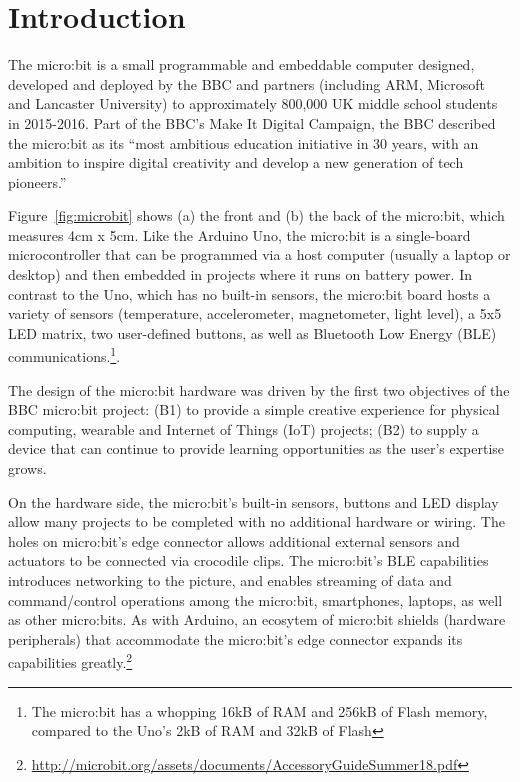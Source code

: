 \section{Introduction}
\label{sec:intrp}


The micro:bit is a small programmable and embeddable computer designed, 
developed and deployed by the BBC and partners (including ARM, Microsoft
and Lancaster University) to approximately 800,000 UK middle school students
in 2015-2016. Part of the BBC's Make It Digital Campaign, the BBC described the
micro:bit as its ``most ambitious education initiative in 30 years, 
with an ambition to inspire digital creativity and 
develop a new generation of tech pioneers.''~\cite{BBCwebsite}


Figure~\ref{fig:microbit} shows (a) the front and (b) the back of the
micro:bit, which measures 4cm x 5cm. Like the Arduino Uno, 
the micro:bit is a single-board microcontroller 
that can be programmed via a host computer (usually a laptop or desktop)
and then embedded in projects where it runs on battery power.
In contrast to the Uno, which has no built-in sensors, the micro:bit 
board hosts a variety of sensors (temperature, accelerometer, magnetometer, 
light level), 
a 5x5 LED matrix, two user-defined buttons, as well as Bluetooth
Low Energy (BLE) communications.\footnote{The micro:bit has a whopping
16kB of RAM and 256kB of Flash memory, compared to the Uno's 2kB of 
RAM and 32kB of Flash}.

The design of the micro:bit hardware was driven by the
first two objectives of the BBC micro:bit project:
(B1) to provide a simple creative experience for physical computing, wearable and Internet of Things (IoT) projects;
(B2) to supply a device that can continue to provide learning opportunities as the user's expertise grows.

On the hardware side, the micro:bit's built-in sensors, buttons and LED display 
allow many projects to be completed with no additional hardware or wiring. 
The holes on micro:bit's edge
connector allows additional external sensors and actuators to be connected via crocodile clips.
The micro:bit's BLE capabilities introduces networking to the
picture, and enables streaming of data and command/control operations among the micro:bit, 
smartphones, laptops, as well as other micro:bits.
As with Arduino, an ecosytem of micro:bit shields
(hardware peripherals) that accommodate the micro:bit's edge
connector expands its capabilities greatly.\footnote{
\url{http://microbit.org/assets/documents/AccessoryGuideSummer18.pdf}
}

